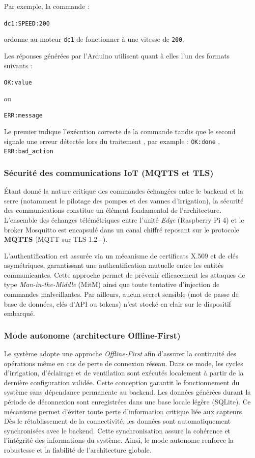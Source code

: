 Par exemple, la commande :


\texttt{dc1:SPEED:200}


ordonne au moteur \texttt{dc1} de fonctionner à une vitesse de \texttt{200}.

Les réponses générées par l'Arduino utilisent quant à elles l'un des formats suivants :


\texttt{OK:value}


ou


\texttt{ERR:message}


Le premier indique l'exécution correcte de la commande tandis que le second signale une erreur détectée lors du traitement , par example : \texttt{OK:done} , \texttt{ERR:bad\_action}

\subsubsection*{Sécurité des communications IoT (MQTTS et TLS)}
Étant donné la nature critique des commandes échangées entre le backend et la serre (notamment le pilotage des pompes et des vannes d’irrigation), la sécurité des communications constitue un élément fondamental de l’architecture. L’ensemble des échanges télémétriques entre l’unité \textit{Edge} (Raspberry Pi 4) et le broker Mosquitto est encapsulé dans un canal chiffré reposant sur le protocole \textbf{MQTTS} (MQTT sur TLS 1.2+).

L’authentification est assurée via un mécanisme de certificats X.509 et de clés asymétriques, garantissant une authentification mutuelle entre les entités communicantes. Cette approche permet de prévenir efficacement les attaques de type \textit{Man-in-the-Middle} (MitM) ainsi que toute tentative d’injection de commandes malveillantes. Par ailleurs, aucun secret sensible (mot de passe de base de données, clés d’API ou tokens) n’est stocké en clair sur le dispositif embarqué.

\subsubsection*{Mode autonome (architecture Offline-First)}
Le système adopte une approche \textit{Offline-First} afin d’assurer la continuité des opérations même en cas de perte de connexion réseau.
Dans ce mode, les cycles d’irrigation, d’éclairage et de ventilation sont exécutés localement à partir de la dernière configuration validée.
Cette conception garantit le fonctionnement du système sans dépendance permanente au backend.
Les données générées durant la période de déconnexion sont enregistrées dans une base locale légère (SQLite).
Ce mécanisme permet d’éviter toute perte d’information critique liée aux capteurs.
Dès le rétablissement de la connectivité, les données sont automatiquement synchronisées avec le backend.
Cette synchronisation assure la cohérence et l’intégrité des informations du système.
Ainsi, le mode autonome renforce la robustesse et la fiabilité de l’architecture globale.

